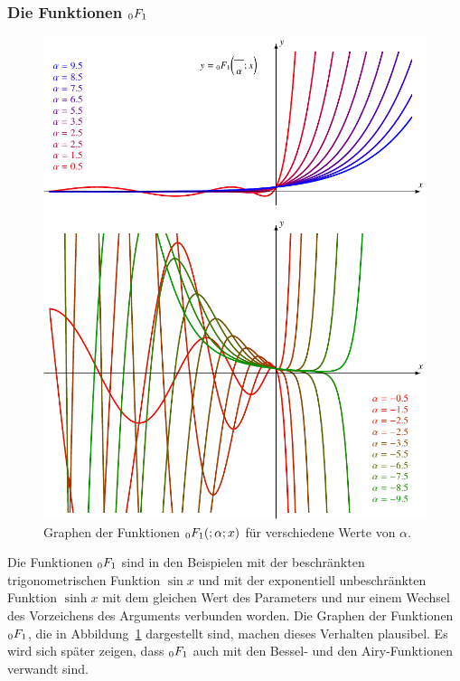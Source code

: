 \subsubsection{Die Funktionen $\mathstrut_0F_1$}
\begin{figure}
\centering
\includegraphics{chapters/040-rekursion/images/0f1.pdf}
\caption{Graphen der Funktionen $\mathstrut_0F_1(;\alpha;x)$ für
verschiedene Werte von $\alpha$.
\label{buch:rekursion:hypergeometrisch:0f1}}
\end{figure}
Die Funktionen $\mathstrut_0F_1$ sind in den Beispielen mit der
beschränkten trigonometrischen Funktion $\sin x$ und mit der
exponentiell unbeschränkten Funktion $\sinh x$ mit dem gleichen
Wert des Parameters und nur einem Wechsel des Vorzeichens des
Arguments verbunden worden.
Die Graphen der Funktionen $\mathstrut_0F_1$, die in 
Abbildung~\ref{buch:rekursion:hypergeometrisch:0f1} dargestellt sind,
machen dieses Verhalten plausibel.
Es wird sich später zeigen, dass $\mathstrut_0F_1$ auch mit den Bessel-
und den Airy-Funktionen verwandt sind.



